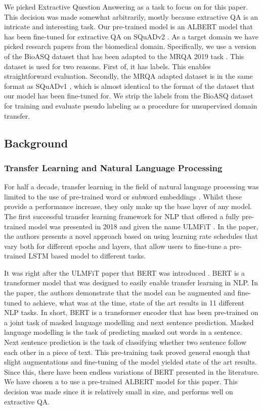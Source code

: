 \documentclass[twoside,twocolumn]{article}
\begin{document}
We picked Extractive Question Answering as a task to focus on for this
paper. This decision was made somewhat arbitrarily, mostly because extractive QA is an
intricate and interesting task. Our pre-trained model is an ALBERT model
\cite{lan2019albert} that
has been fine-tuned for extractive QA on SQuADv2 \cite{rajpurkar2018know}. As a target domain we have picked research
papers from the biomedical domain. Specifically, we use a version of the BioASQ
dataset that has been adapted to the MRQA 2019 task \cite{fisch2019mrqa}. This
dataset is used for two reasons. First of, it has labels. This enables
straightforward evaluation. Secondly, the MRQA adapted dataset is in the same
format as SQuADv1 \cite{rajpurkar2016squad} , which is almost identical to the format of the dataset that
our model has been fine-tuned for. We strip the labels from the BioASQ dataset
for training and evaluate pseudo labeling as a procedure for unsupervised domain
transfer.

\subsection{Background}
\subsubsection{Transfer Learning and Natural Language Processing}
For half a decade, transfer learning in the field of natural language processing
was limited to the use of pre-trained word or subword embeddings
\cite{mikolov2013distributed} \cite{pennington2014glove}. Whilst these provide a performance
increase, they only make up the base layer of any model. 
The first successful transfer learning framework for NLP that offered a fully
pre-trained model was presented in 2018 and given the name ULMFiT
\cite{howard2018universal}. In the paper, the authors presents a novel approach based on
using learning rate schedules that vary both for different epochs and layers,
that allow users to fine-tune a pre-trained LSTM based model to different tasks. 

It was right after the ULMFiT paper that BERT was introduced
\cite{devlin2018bert}. BERT is a transformer model \cite{vaswani2017attention}
that was designed to easily enable transfer learning in NLP. In the paper, the
authors demonstrate that the model can be augmented and fine-tuned to achieve,
what was at the time, state of the art results in 11 different NLP tasks. In
short, BERT is a transformer encoder that has been pre-trained on a joint task
of masked language modelling and next sentence prediction. Masked language
modelling is the task of predicting masked out words in a sentence.  Next
sentence prediction is the task of classifying whether two sentence follow each
other in a piece of text. This pre-training task proved general enough that
slight augmentations and fine-tuning of the model yielded state of the art
results. Since this, there have been endless variations of BERT presented in the
literature. We have chosen a to use a pre-trained ALBERT model
\cite{lan2019albert} for this paper. This decision was made since it is
relatively small in size, and performs well on extractive QA.
\end{document}

